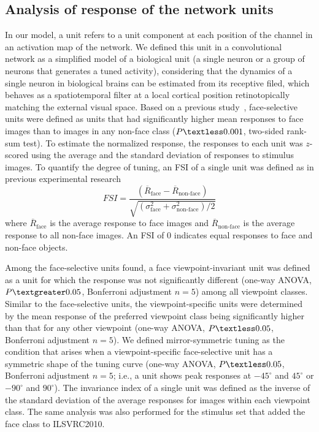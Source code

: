 \documentclass[sn-mathphys-num]{sn-jnl}%
\theoremstyle{thmstyleone}%
\theoremstyle{thmstyletwo}%
\theoremstyle{thmstylethree}%
\begin{document}
\subsection{Analysis of response of the network units}
In our model, a unit refers to a unit component at each position of the channel in an activation map of the network.
We defined this unit in a convolutional network as a simplified model of a biological unit (a single neuron or a group of neurons that generates a tuned activity), considering that the dynamics of a single neuron in biological brains can be estimated from its receptive filed, 
which behaves as a spatiotemporal filter at a local cortical position retinotopically matching the external visual space.
Based on a previous study~\cite{grossman2019convergent}, face-selective units were defined as units that had significantly higher mean responses to face images than to images in any non-face class ($ P \textless 0.001 $, two-sided rank-sum test).
To estimate the normalized response, the responses to each unit was $ z $-scored using the average and the standard deviation of responses to stimulus images.
To quantify the degree of tuning, an FSI of a single unit was defined as in previous experimental research~\cite{aparicio2016neurophysiological}
\begin{equation}\label{eq:fsi}
	FSI = \frac{(\overline{R}_\textrm{face} - \overline{R}_\textrm{non-face})}
	{\sqrt{(\sigma^2_\textrm{face} + \sigma^2_\textrm{non-face}) / 2}}
\end{equation}
where $ \overline{R}_\textrm{face} $ is the average response to face images 
and $ \overline{R}_\textrm{non-face} $ is the average response to all non-face images.
An FSI of 0 indicates equal responses to face and non-face objects.


Among the face-selective units found, a face viewpoint-invariant unit was defined as a unit for which the response was not significantly different (one-way ANOVA, $ P \textgreater 0.05 $, Bonferroni adjustment $ n = 5 $) among all viewpoint classes.
Similar to the face-selective units, the viewpoint-specific units were determined by the mean response of the preferred viewpoint class being significantly higher than that for any other viewpoint (one-way ANOVA, $ P \textless 0.05 $, Bonferroni adjustment $ n = 5 $).
We defined mirror-symmetric tuning as the condition that arises when a viewpoint-specific face-selective unit has a symmetric shape of the tuning curve (one-way ANOVA, $ P \textless 0.05 $, Bonferroni adjustment $ n = 5 $; i.e., a unit shows peak responses at $ -45^\circ $ and $ 45^\circ $ or $ -90^\circ $ and $ 90^\circ $).
The invariance index of a single unit was defined as the inverse of the standard deviation of the average responses for images within each viewpoint class.
The same analysis was also performed for the stimulus set that added the face class to ILSVRC2010.
\end{document}
